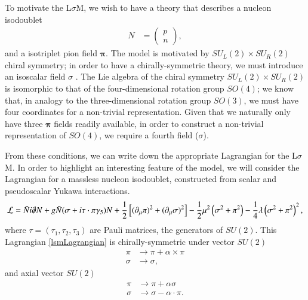 \documentclass[aps,prd,onecolumn,showpacs,amsmath,amssymb,nofootinbib, 11pt]{revtex4} \pdfoutput=1
\newcommand{\lsm}{L$\sigma$M}
\newcommand{\groupsu}[1]{S\!U(#1)}
\begin{document}
To motivate the \lsm, we wish to have a theory that describes a nucleon isodoublet 
\begin{align}
    N &= 
        \begin{pmatrix}
          p \\
          n
        \end{pmatrix},
  \end{align}
  and a isotriplet pion field $\mathbf{\pi}$. The model is motivated by ${S\!U}_L(2)\times {S\!U}_R(2)$ chiral symmetry; in order to have a chirally-symmetric theory, we must introduce an isoscalar field $\sigma$ \cite{Epelbaum2010}. The Lie algebra of the chiral symmetry ${S\!U}_L(2)\times {S\!U}_R(2)$ is isomorphic to that of the four-dimensional rotation group $S\!O(4)$; we know that, in analogy to the three-dimensional rotation group $S\!O(3)$, we must have four coordinates for a non-trivial representation. Given that we naturally only have three $\mathbf{\pi}$ fields readily available, in order to construct a non-trivial representation of $S\!O(4)$, we require a fourth field ($\sigma$).
  
  From these conditions, we can write down the appropriate Lagrangian for the \lsm. In order to highlight an interesting feature of the model, we will consider the Lagrangian for a massless nucleon isodoublet, constructed from scalar and pseudoscalar Yukawa interactions. 
  \begin{equation}
      \label{lsmLagrangian}
      \mathcal{L} = \bar{N}i \slashed{\partial}N + g\bar{N}(\sigma + i \mathbf{\tau \cdot \pi}\gamma_{5})N +\frac{1}{2}\left[(\partial_{\mu}\mathbf{\pi})^{2}+(\partial_{\mu}\mathbf{\sigma})^{2}\right]-\frac{1}{2}\mu^2\left(\sigma^2+\mathbf{\pi}^2\right) - \frac{1}{4}\lambda\left(\sigma^2+\mathbf{\pi}^2\right)^2,
  \end{equation}
  where $\tau = (\tau_1, \tau_2, \tau_3)$ are Pauli matrices, the generators of $\groupsu{2}$.
  This Lagrangian \eqref{lsmLagrangian} is chirally-symmetric under vector $\groupsu{2}$
  \begin{align}
      \pi  & \rightarrow \pi + \alpha \times \pi\\
      \sigma & \rightarrow \sigma,
  \end{align}
  and axial vector $\groupsu{2}$
  \begin{align}
      \pi  & \rightarrow \pi + \alpha\sigma\\
      \sigma & \rightarrow \sigma-\alpha \cdot \pi.
  \end{align}
  
\end{document}
